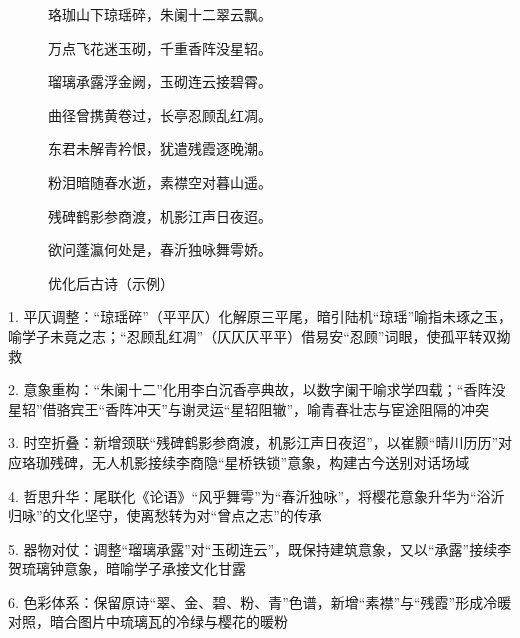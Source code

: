 \begin{figure}[ht]
  \centering
  \begin{tcolorbox}[
      colback=white,
      colframe=black,
      boxrule=1pt,
      arc=0mm,
      width=0.6\linewidth,  %
      ]
      \kaishu
      \centering
      珞珈山下琼瑶碎，朱阑十二翠云飘。\par
      万点飞花迷玉砌，千重香阵没星轺。\par
      瑠璃承露浮金阙，玉砌连云接碧霄。\par
      曲径曾携黄卷过，长亭忍顾乱红凋。\par
      东君未解青衿恨，犹遣残霞逐晚潮。\par
      粉泪暗随春水逝，素襟空对暮山遥。\par
      残碑鹤影参商渡，机影江声日夜迢。\par
      欲问蓬瀛何处是，春沂独咏舞雩娇。\par
  \end{tcolorbox}
  \caption{优化后古诗（示例）}
  \label{fig:example_poem_optimized}
\end{figure}

\begin{tcolorbox}[
  colback=white,
  colframe=black,
  boxrule=1pt,
  arc=0mm,
  ]
  \kaishu
  1. 平仄调整：“琼瑶碎”（平平仄）化解原三平尾，暗引陆机“琼瑶”喻指未琢之玉，喻学子未竟之志；“忍顾乱红凋”（仄仄仄平平）借易安“忍顾”词眼，使孤平转双拗救\par
  2. 意象重构：“朱阑十二”化用李白沉香亭典故，以数字阑干喻求学四载；“香阵没星轺”借骆宾王“香阵冲天”与谢灵运“星轺阻辙”，喻青春壮志与宦途阻隔的冲突\par
  3. 时空折叠：新增颈联“残碑鹤影参商渡，机影江声日夜迢”，以崔颢“晴川历历”对应珞珈残碑，无人机影接续李商隐“星桥铁锁”意象，构建古今送别对话场域\par
  4. 哲思升华：尾联化《论语》“风乎舞雩”为“春沂独咏”，将樱花意象升华为“浴沂归咏”的文化坚守，使离愁转为对“曾点之志”的传承\par
  5. 器物对仗：调整“瑠璃承露”对“玉砌连云”，既保持建筑意象，又以“承露”接续李贺琉璃钟意象，暗喻学子承接文化甘露\par
  6. 色彩体系：保留原诗“翠、金、碧、粉、青”色谱，新增“素襟”与“残霞”形成冷暖对照，暗合图片中琉璃瓦的冷绿与樱花的暖粉\par

\end{tcolorbox}

